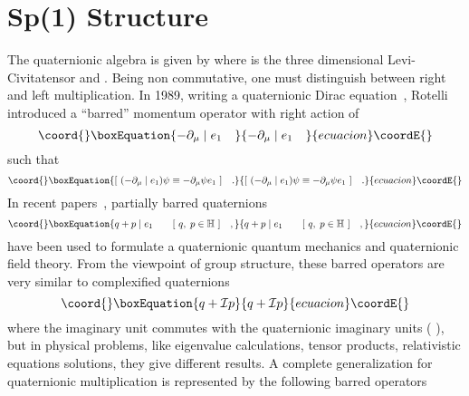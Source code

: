 \documentclass[a4paper,12pt]{book}
\begin{document}
\section{Sp(1) Structure}

The quaternionic algebra is given by \coordHE{} where\coordHE{} is the three dimensional Levi-Civita\myHighlight{$%
\ $}\coordHE{}tensor \coordHE{} and \coordHE{}. Being non
commutative, one must distinguish between right and left multiplication. In
1989, writing a quaternionic Dirac equation~\cite{rot}, Rotelli introduced a
``barred'' momentum operator with right action of \coordHE{} 
\begin{equation}\coord{}\boxEquation{
-\partial _{\mu }\mid e_{1}\quad
}{
-\partial _{\mu }\mid e_{1}\quad
}{ecuacion}\coordE{}\end{equation}
such that 
\begin{equation}\coord{}\boxEquation{
\lbrack ~(-\partial _{\mu }\mid e_{1})\psi \equiv -\partial _{\mu }\psi
e_{1}~]\quad .
}{
\lbrack ~(-\partial _{\mu }\mid e_{1})\psi \equiv -\partial _{\mu }\psi
e_{1}~]\quad .
}{ecuacion}\coordE{}\end{equation}
In recent papers~\cite{deleos}, partially barred quaternions 
\begin{equation}\coord{}\boxEquation{
q+p\mid e_{1}\quad \quad [~q,\;p\in \Bbb{H}~]\quad ,
}{
q+p\mid e_{1}\quad \quad [~q,\;p\in \Bbb{H}~]\quad ,
}{ecuacion}\coordE{}\end{equation}
have been used to formulate a quaternionic quantum mechanics and
quaternionic field theory. From the viewpoint of group structure, these
barred operators are very similar to complexified quaternions~\cite{morita} 
\begin{equation}\coord{}\boxEquation{
q+\mathcal{I}p
}{
q+\mathcal{I}p
}{ecuacion}\coordE{}\end{equation}
where the imaginary unit \coordHE{} commutes with the quaternionic
imaginary units (\coordHE{}  \coordHE{}  \coordHE{}), but in physical problems, like
eigenvalue calculations, tensor products, relativistic equations solutions,
they give different results. A complete generalization for quaternionic
multiplication is represented by the following barred operators 
\end{document}
